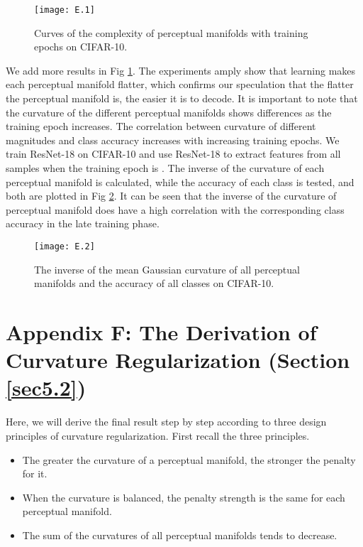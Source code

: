 \documentclass[10pt,twocolumn,letterpaper]{article}
\begin{document}
\begin{figure}[t]
\centering
\centerline{\texttt{[image: E.1]}}
\vskip -0.1in
\caption{Curves of the complexity of perceptual manifolds with training epochs on CIFAR-10.}
\label{fig12}
\vskip -0.1in
\end{figure}

We add more results in Fig \ref{fig12}. The experiments amply show that learning makes each perceptual manifold flatter, which confirms our speculation that the flatter the perceptual manifold is, the easier it is to decode. It is important to note that the curvature of the different perceptual manifolds shows differences as the training epoch increases. The correlation between curvature of different magnitudes and class accuracy increases with increasing training epochs. We train ResNet-18 on CIFAR-10 and use ResNet-18 to extract features from all samples when the training epoch is . The inverse of the curvature of each perceptual manifold is calculated, while the accuracy of each class is tested, and both are plotted in Fig \ref{fig13}. It can be seen that the inverse of the curvature of perceptual manifold does have a high correlation with the corresponding class accuracy in the late training phase. 

\begin{figure}[t]
\centering
\centerline{\texttt{[image: E.2]}}
\vskip -0.1in
\caption{The inverse of the mean Gaussian curvature of all perceptual manifolds and the accuracy of all classes on CIFAR-10.}
\label{fig13}
\vskip -0.15in
\end{figure}

\section*{Appendix F: The Derivation of Curvature Regularization (Section \ref{sec5.2})}
\label{secF}

Here, we will derive the final result step by step according to three design principles of curvature regularization. First recall the three principles.
\begin{itemize}
    \item[(1)] The greater the curvature of a perceptual manifold, the stronger the penalty for it.
    \item[(2)] When the curvature is balanced, the penalty strength is the same for each perceptual manifold.
    \item[(3)] The sum of the curvatures of all perceptual manifolds tends to decrease.
\end{itemize}
\end{document}
